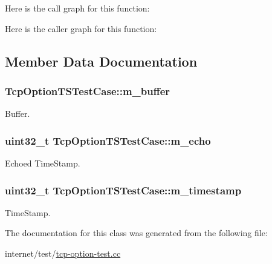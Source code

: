 Here is the call graph for this function\+:




Here is the caller graph for this function\+:




\subsection{Member Data Documentation}
\subsubsection[{\texorpdfstring{m\+\_\+buffer}{m_buffer}}]{ Tcp\+Option\+T\+S\+Test\+Case\+::m\+\_\+buffer\hspace{0.3cm}{\ttfamily [private]}}\hypertarget{classTcpOptionTSTestCase_a7c5e19027a9a1566e449db35cc79c5cc}{}\label{classTcpOptionTSTestCase_a7c5e19027a9a1566e449db35cc79c5cc}


Buffer. 

\subsubsection[{\texorpdfstring{m\+\_\+echo}{m_echo}}]{\setlength{\rightskip}{0pt plus 5cm}uint32\+\_\+t Tcp\+Option\+T\+S\+Test\+Case\+::m\+\_\+echo\hspace{0.3cm}{\ttfamily [private]}}\hypertarget{classTcpOptionTSTestCase_a43df6b347eed0fede4338c2c68d4485f}{}\label{classTcpOptionTSTestCase_a43df6b347eed0fede4338c2c68d4485f}


Echoed Time\+Stamp. 

\subsubsection[{\texorpdfstring{m\+\_\+timestamp}{m_timestamp}}]{\setlength{\rightskip}{0pt plus 5cm}uint32\+\_\+t Tcp\+Option\+T\+S\+Test\+Case\+::m\+\_\+timestamp\hspace{0.3cm}{\ttfamily [private]}}\hypertarget{classTcpOptionTSTestCase_a18d1b6b381e3662e8c71340f7517cd67}{}\label{classTcpOptionTSTestCase_a18d1b6b381e3662e8c71340f7517cd67}


Time\+Stamp. 



The documentation for this class was generated from the following file\+:\begin{DoxyCompactItemize}
\item 
internet/test/\hyperlink{tcp-option-test_8cc}{tcp-\/option-\/test.\+cc}\end{DoxyCompactItemize}
